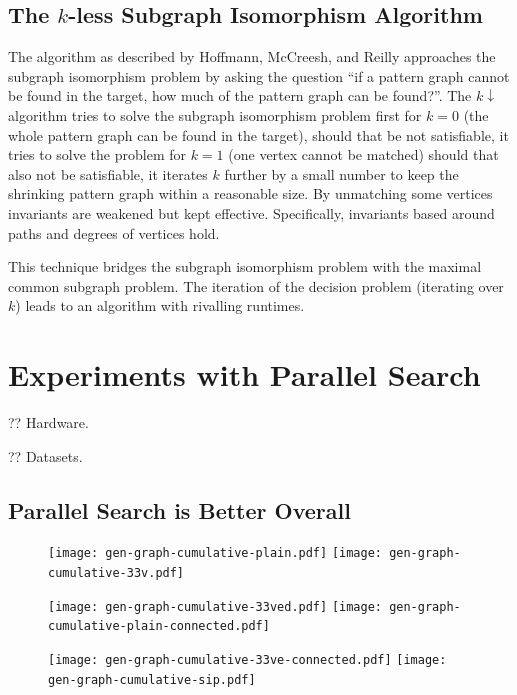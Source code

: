 \documentclass{llncs}
\begin{document}
\subsection{The $k$-less Subgraph Isomorphism Algorithm}

The algorithm as described by Hoffmann, McCreesh, and Reilly \cite{DBLP:conf/aaai/HoffmannMR17} approaches the subgraph isomorphism problem by asking the question ``if a pattern graph cannot be found in the target, how much of the pattern graph can be found?''. The $k{\downarrow}$ algorithm tries to solve the subgraph isomorphism problem first for $k=0$ (the whole pattern graph can be found in the target), should that be not satisfiable, it tries to solve the problem for $k=1$ (one vertex cannot be matched) should that also not be satisfiable, it iterates $k$ further by a small number to keep the shrinking pattern graph within a reasonable size. By unmatching some vertices  invariants are weakened but kept effective. Specifically, invariants based around paths and degrees of vertices hold.

This technique bridges the subgraph isomorphism problem with the maximal common subgraph problem. The iteration of the decision problem (iterating over $k$) leads to an algorithm with rivalling runtimes.

\section{Experiments with Parallel Search}

?? Hardware.

?? Datasets.

\subsection{Parallel Search is Better Overall}

\begin{figure}[p]
    \texttt{[image: gen-graph-cumulative-plain.pdf]}
    \hfill
    \texttt{[image: gen-graph-cumulative-33v.pdf]}

    \vspace*{1em}

    \texttt{[image: gen-graph-cumulative-33ved.pdf]}
    \hfill
    \texttt{[image: gen-graph-cumulative-plain-connected.pdf]}

    \vspace*{1em}

    \texttt{[image: gen-graph-cumulative-33ve-connected.pdf]}
    \hfill
    \texttt{[image: gen-graph-cumulative-sip.pdf]}

\end{figure}
\end{document}
